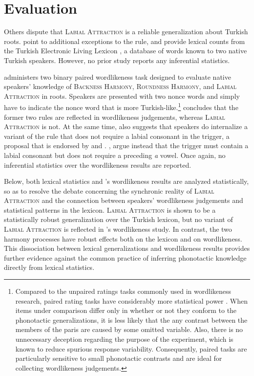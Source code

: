 \section{Evaluation}

Others dispute that \textsc{Labial Attraction} is a reliable generalization about Turkish roots. \citet{Clements1982} point to additional exceptions to the rule, and \citet{Inkelas2001} provide lexical counts from the Turkish Electronic Living Lexicon \citep[TELL;][]{TELL}, a database of words known to two native Turkish speakers. However, no prior study reports any inferential statistics.

\citet[311]{Zimmer1969} administers two binary paired wordlikeness task designed to evaluate native speakers' knowledge of \textsc{Backness Harmony}, \textsc{Roundness Harmony}, and \textsc{Labial Attraction} in roots. Speakers are presented with two nonce words and simply have to indicate the nonce word that is more Turkish-like.\footnote{Compared to the unpaired ratings tasks  commonly used in wordlikeness research, paired rating tasks have considerably more statistical power \citep{Gigerenzer2004}. When items under comparison differ only in whether or not they conform to the phonotactic generalizations, it is less likely that the any contrast between the members of the paris are caused by some omitted variable. Also, there is no unnecessary deception regarding the purpose of the experiment, which is known to reduce spurious response variability. Consequently, paired tasks are particularly sensitive to small phonotactic contrasts and are ideal for collecting wordlikeness judgements.} \citeauthor{Zimmer1969} concludes that the former two rules are reflected in wordlikeness judgements, whereas \textsc{Labial Attraction} is not. At the same time, \citeauthor{Zimmer1969} also suggests that speakers do internalize a variant of the rule that does not require a labial consonant in the trigger, a proposal that is endorsed by \citet{Clements1982} and \citet[4]{Zuraw2000}. \citet[196]{Inkelas2001}, argue instead that the trigger must contain a labial consonant but does not require a preceding \emph{a} vowel. Once again, no inferential statistics over the wordlikeness results are reported.

Below, both lexical statistics and \citeauthor{Zimmer1969}'s wordlikeness results are analyzed statistically, so as to resolve the debate concerning the synchronic reality of \textsc{Labial Attraction} and the connection between speakers' wordlikeness judgements and statistical patterns in the lexicon. \textsc{Labial Attraction} is shown to be a statistically robust generalization over the Turkish lexicon, but no variant of \textsc{Labial Attraction} is reflected in \citeauthor{Zimmer1969}'s wordlikeness study. In contrast, the two harmony processes have robust effects both on the lexicon and on wordlikeness.  This dissociation between lexical generalizations and wordlikeness results provides further evidence against the common practice of inferring phonotactic knowledge directly from lexical statistics.

